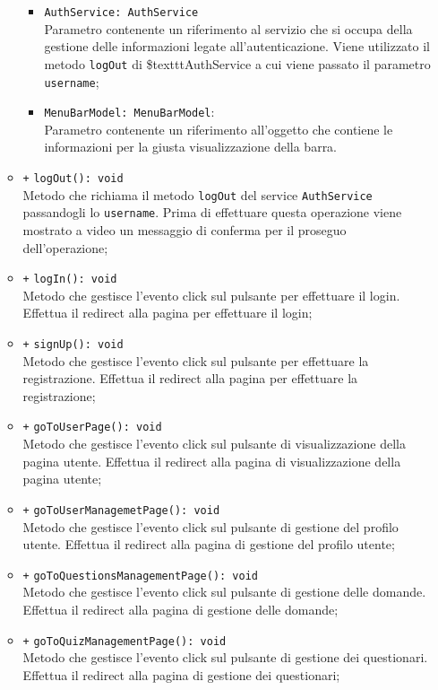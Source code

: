 \begin{itemize}
\begin{itemize}
\begin{itemize}
			\item \texttt{AuthService: AuthService} \\
			Parametro contenente un riferimento al servizio che si occupa della gestione delle informazioni legate all’autenticazione.  Viene utilizzato il metodo \texttt{logOut} di \$texttt{AuthService} a cui viene passato il parametro \texttt{username};
			\item \texttt{MenuBarModel: MenuBarModel}: \\
			Parametro contenente un riferimento all'oggetto che contiene le informazioni per la giusta visualizzazione della barra.
		\end{itemize}
		\item \texttt{+} \texttt{logOut(): void} \\
		Metodo che richiama il metodo \texttt{logOut} del service \texttt{AuthService} passandogli lo \texttt{username}. Prima di effettuare questa operazione viene mostrato a video un messaggio di conferma per il proseguo dell'operazione; 
		\item \texttt{+} \texttt{logIn(): void} \\
		Metodo che gestisce l’evento click sul pulsante per effettuare il login. Effettua il redirect alla pagina per effettuare il login; 
		\item \texttt{+} \texttt{signUp(): void} \\
		Metodo che gestisce l’evento click sul pulsante per effettuare la registrazione. Effettua il redirect alla pagina per effettuare la registrazione; 
		\item \texttt{+} \texttt{goToUserPage(): void} \\
		Metodo che gestisce l’evento click sul pulsante di visualizzazione della pagina utente. Effettua il redirect alla pagina di visualizzazione della pagina utente; 
		\item \texttt{+} \texttt{goToUserManagemetPage(): void} \\
		Metodo che gestisce l’evento click sul pulsante di gestione del profilo utente. Effettua il redirect alla pagina di gestione del profilo utente; 
		\item \texttt{+} \texttt{goToQuestionsManagementPage(): void} \\
		Metodo che gestisce l’evento click sul pulsante di gestione delle domande. Effettua il redirect alla pagina di gestione delle domande; 
		\item \texttt{+} \texttt{goToQuizManagementPage(): void} \\
		Metodo che gestisce l’evento click sul pulsante di gestione dei questionari. Effettua il redirect alla pagina di gestione dei questionari;

\end{itemize}
\end{itemize}
